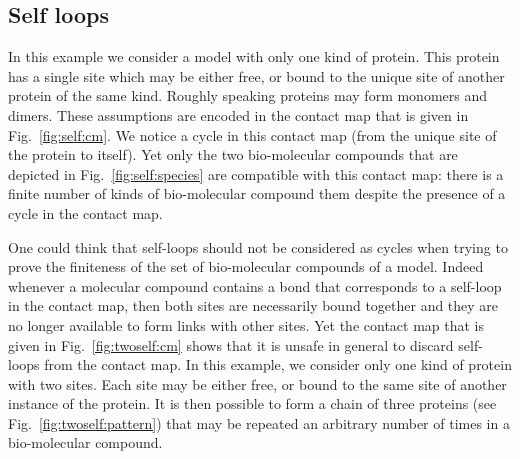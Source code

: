 \documentclass{entcs}
\begin{document}
\subsection{Self loops}
\label{sec:self-loop}
In this example we consider a model with only one kind of protein. This protein has a single site which may be either free, or bound to the unique site of another protein of the same kind. Roughly speaking proteins may form monomers  and dimers. These assumptions are encoded in the contact map that is given in Fig.~\ref{fig:self:cm}. We notice a cycle in this contact map (from the unique site of the protein to itself). Yet only the two bio-molecular compounds that are depicted in Fig.~\ref{fig:self:species} are compatible with this contact map:  there is a finite number of kinds of bio-molecular compound them despite the presence of a cycle in the contact map.

One could think that self-loops should not be considered as cycles when trying to prove the finiteness of the set of bio-molecular compounds of a model. Indeed whenever a molecular compound contains a bond that corresponds to a self-loop in the contact map, then both sites are necessarily  bound together and they are no longer available to form links with other sites. Yet the contact map that is given in Fig.~\ref{fig:twoself:cm} shows that it is unsafe in general  to discard self-loops from the contact map. In this example, we consider only one kind of protein with two sites. Each site may be either free, or bound to the same site of another instance of the protein. It is then possible to form a chain of three proteins (see Fig.~\ref{fig:twoself:pattern}) that may be repeated an arbitrary number of times in a bio-molecular compound.
\end{document}

